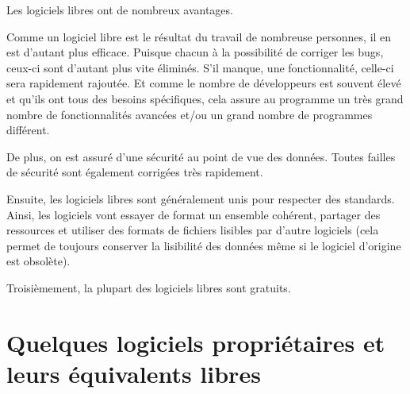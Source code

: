 Les logiciels libres ont de nombreux avantages.

Comme un logiciel libre est le résultat du travail de nombreuse personnes, il en est d'autant plus efficace. Puisque chacun à la possibilité de corriger les bugs, ceux-ci sont d'autant plus vite éliminés. S'il manque, une fonctionnalité, celle-ci sera rapidement rajoutée. Et comme le nombre de développeurs est souvent élevé et qu'ils ont tous des besoins spécifiques, cela assure au programme un très grand nombre de fonctionnalités avancées et/ou un grand nombre de programmes différent.

De plus, on est assuré d'une sécurité au point de vue des données. Toutes failles de sécurité sont également corrigées très rapidement.

Ensuite, les logiciels libres sont généralement unis pour respecter des standards. Ainsi, les logiciels vont essayer de format un ensemble cohérent, partager des ressources et utiliser des formats de fichiers lisibles par d'autre logiciels (cela permet de toujours conserver la lisibilité des données même si le logiciel d'origine est obsolète). %

Troisièmement, la plupart des logiciels libres sont gratuits.

\section*{Quelques logiciels propriétaires et leurs équivalents libres}

